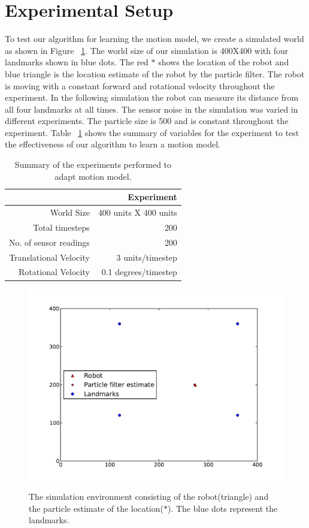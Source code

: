 \documentclass[12pt]{dalcsthesis}
\begin{document}
\section{Experimental Setup}
To test our algorithm for learning the motion model, we create a simulated world as shown in Figure ~\ref{fig-: simulation world}. The world size of our simulation is 400X400 with four landmarks shown in blue dots. The red $\ast$ shows the location of the robot and blue triangle is the location estimate of the robot by the particle filter. The robot is moving with a constant forward and rotational velocity throughout the experiment. In the following  simulation the robot can measure its distance from all four landmarks at all times. The sensor noise in the simulation was varied in different experiments. The particle size is 500 and is constant throughout the experiment. Table ~\ref{tab-constant parameters} shows the summary of variables for the experiment to test the effectiveness of our algorithm to learn a motion model.
\begin{table}[tbh]
\centering
\begin{tabular}{|r|r|}
    \hline
    & Experiment \\
    \hline \hline
    World Size & 400 units X 400 units\\
    \hline
    Total timesteps & 200  \\
    \hline
    No. of sensor readings & 200 \\
    \hline
    Translational Velocity & 3 units/timestep \\
    \hline
    Rotational Velocity & 0.1 degrees/timestep \\
    \hline
\end{tabular}
 \caption{\label{tab-constant parameters}Summary of the experiments performed to adapt motion model.}
\end{table}

\begin{figure}
  \centering
     {\includegraphics[height = 3.0 in]{./plots/world.pdf}}
  \caption{\label{fig-: simulation world}The simulation environment consisting of the robot(triangle) and the particle estimate of the location($\ast$). The blue dots represent the landmarks.}
\end{figure}
\end{document}
